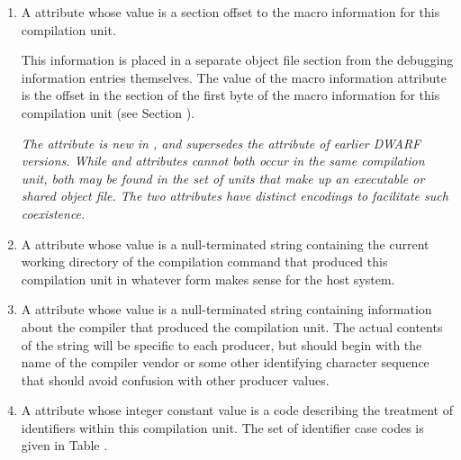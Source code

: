 \begin{enumerate}[1. ]
\item A \DWATmacrosDEFN{}\hypertarget{chap:DWATmacrosmacroinformation}{}
attribute 
whose value is a 
section offset to the macro information for this compilation unit.

This information is placed in a separate object file section
from the debugging information entries themselves. The
value of the macro information attribute is the offset in
the \dotdebugmacro{} section of the first byte of the macro
information for this compilation unit 
(see Section ).

\textit{The \DWATmacrosNAME{} attribute is new in \DWARFVersionV, 
and supersedes the 
\DWATmacroinfoDEFN{} attribute of earlier DWARF versions.
While \DWATmacrosNAME{} and \DWATmacroinfoNAME{} attributes cannot both occur in the same
compilation unit, both may be found in the set of units that make up an executable
or shared object file. The two attributes have distinct encodings to facilitate such
coexistence.}

\item  \hypertarget{chap:DWATcompdircompilationdirectory}{}
A \DWATcompdirDEFN{} attribute 
whose value is a
null-terminated string containing the current working directory
of the compilation command that produced this compilation
unit in whatever form makes sense for the host system.

\item  \hypertarget{chap:DWATproducercompileridentification}{}
A \DWATproducerDEFN{} attribute
whose value is a null-terminated string containing 
information about the compiler
that produced the compilation unit. The actual contents of
the string will be specific to each producer, but should
begin with the name of the compiler vendor or some other
identifying character sequence that should avoid confusion
with other producer values.

\item  \hypertarget{chap:DWATidentifiercaseidentifiercaserule}{}
A \DWATidentifiercaseDEFN{} attribute 
 whose integer
constant value is a code describing the treatment
of identifiers within this compilation unit. The
set of identifier case codes is given in
Table .


\end{enumerate}
